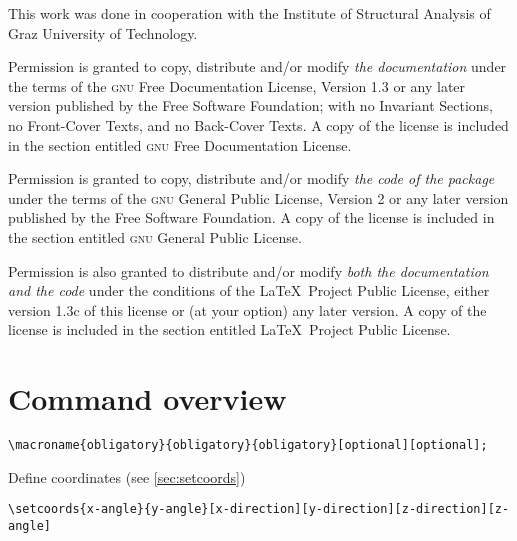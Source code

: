 \documentclass[%
  a4paper,
  BCOR20mm,
  pointlessnumbers,
  twoside,
  halfparskip,
  openright,
]{scrreprt}
\begin{document}
\medskip
This work was done in cooperation with the Institute of Structural Analysis of Graz University of Technology.

  \medskip
  Permission is granted to copy, distribute and/or modify \emph{the documentation} under the terms of the \textsc{gnu} Free Documentation License, Version 1.3 or any later version published by the Free Software Foundation; with no Invariant Sections, no Front-Cover Texts, and no Back-Cover Texts. A copy of the license is included in the section entitled \textsc{gnu} Free Documentation License.

  \medskip
  Permission is granted to copy, distribute and/or modify \emph{the code of the package} under the terms of the \textsc{gnu} General Public License, Version 2 or any later version published by the Free Software Foundation. A copy of the license is included in the section entitled \textsc{gnu} General Public License.

  \medskip
  Permission is also granted to distribute and/or modify \emph{both the documentation and the code} under the conditions of the \LaTeX\ Project Public License, either version 1.3c of this license or (at your option) any later version. A copy of the license is included in the section entitled \LaTeX\ Project Public License.

\tableofcontents
\cleardoubleplainpage

\setcounter{page}{1}


\chapter{Command overview}
\label{sec:Befehlsubersicht}

\begin{lstlisting}[emph={macroname},backgroundcolor=\color{red!10}]
		\macroname{obligatory}{obligatory}{obligatory}[optional][optional];
\end{lstlisting}\vspace{-7mm}

Define coordinates (see \ref{sec:setcoords})

\begin{lstlisting}[emph={setcoords},backgroundcolor=\color{white}]
		\setcoords{x-angle}{y-angle}[x-direction][y-direction][z-direction][z-angle]
\end{lstlisting}\vspace{-10mm}
\end{document}
